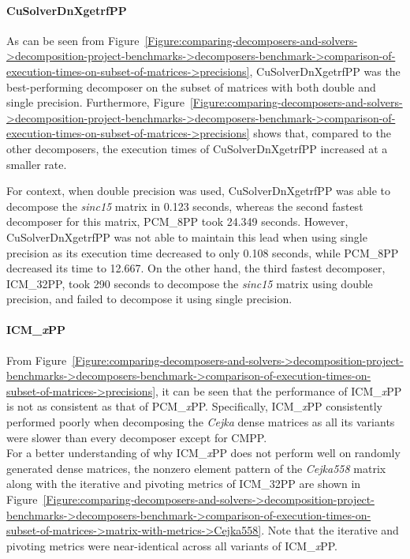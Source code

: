 \paragraph{CuSolverDnXgetrfPP} As can be seen from Figure~\ref{Figure:comparing-decomposers-and-solvers->decomposition-project-benchmarks->decomposers-benchmark->comparison-of-execution-times-on-subset-of-matrices->precisions}, CuSolverDnXgetrfPP was the best-performing decomposer on the subset of matrices with both double and single precision.
Furthermore, Figure~\ref{Figure:comparing-decomposers-and-solvers->decomposition-project-benchmarks->decomposers-benchmark->comparison-of-execution-times-on-subset-of-matrices->precisions} shows that, compared to the other decomposers, the execution times of CuSolverDnXgetrfPP increased at a smaller rate.

For context, when double precision was used, CuSolverDnXgetrfPP was able to decompose the \textit{sinc15} matrix in 0.123 seconds, whereas the second fastest decomposer for this matrix, PCM\_8PP took 24.349 seconds.
However, CuSolverDnXgetrfPP was not able to maintain this lead when using single precision as its execution time decreased to only 0.108 seconds, while PCM\_8PP decreased its time to 12.667.
On the other hand, the third fastest decomposer, ICM\_32PP, took 290 seconds to decompose the \textit{sinc15} matrix using double precision, and failed to decompose it using single precision.

\paragraph{ICM\_\textit{x}PP} From Figure~\ref{Figure:comparing-decomposers-and-solvers->decomposition-project-benchmarks->decomposers-benchmark->comparison-of-execution-times-on-subset-of-matrices->precisions}, it can be seen that the performance of ICM\_\textit{x}PP is not as consistent as that of PCM\_\textit{x}PP.
Specifically, ICM\_\textit{x}PP consistently performed poorly when decomposing the \textit{Cejka} dense matrices as all its variants were slower than every decomposer except for CMPP.\\
For a better understanding of why ICM\_\textit{x}PP does not perform well on randomly generated dense matrices, the nonzero element pattern of the \textit{Cejka558} matrix along with the iterative and pivoting metrics of ICM\_32PP are shown in Figure~\ref{Figure:comparing-decomposers-and-solvers->decomposition-project-benchmarks->decomposers-benchmark->comparison-of-execution-times-on-subset-of-matrices->matrix-with-metrics->Cejka558}.
Note that the iterative and pivoting metrics were near-identical across all variants of ICM\_\textit{x}PP.

